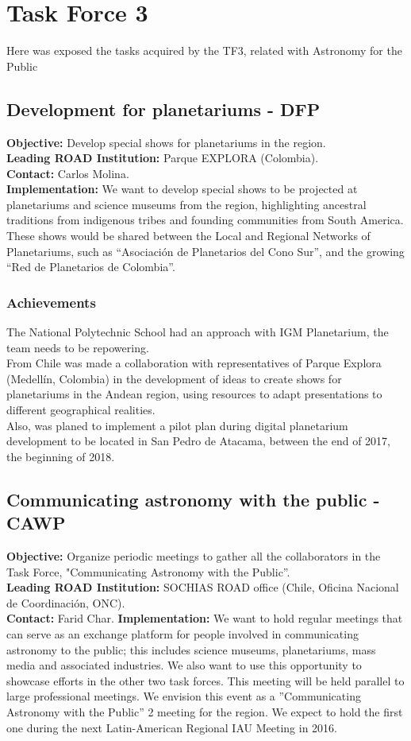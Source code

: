 \newpage
\section{Task Force 3}
\label{chapter 4}

Here was exposed the tasks acquired by the TF3, related with Astronomy for the Public

\subsection{Development for planetariums - DFP}
\textbf{Objective:} Develop special shows for planetariums in the region.
\\
\textbf{Leading ROAD Institution:} Parque EXPLORA (Colombia).
\\
\textbf{Contact:} Carlos Molina.
\\
\textbf{Implementation:} We want to develop special shows to be projected at planetariums and science museums from the region, highlighting ancestral traditions from indigenous tribes and founding communities from South America. These shows would be shared between the Local and Regional Networks of Planetariums, such as “Asociación de Planetarios
del Cono Sur”, and the growing “Red de Planetarios de Colombia”.

\subsubsection{Achievements}
The National Polytechnic School had an approach with IGM Planetarium, the team needs to be repowering.
\\
From Chile was made a collaboration with representatives of Parque Explora (Medellín, Colombia) in the development of ideas to create shows for planetariums in the Andean region, using resources to adapt presentations to different geographical realities.
\\
Also, was planed to implement a pilot plan during digital planetarium development to be located in San Pedro de Atacama, between the end of 2017, the beginning of 2018.

\subsection{Communicating astronomy with the public - CAWP}
\textbf{Objective:} Organize periodic meetings to gather all the collaborators in the Task Force, "Communicating Astronomy with the Public”.
\\
\textbf{Leading ROAD Institution:} SOCHIAS ROAD office (Chile, Oficina Nacional de Coordinación, ONC).
\\
\textbf{Contact:} Farid Char.
\textbf{Implementation:} We want to hold regular meetings that can serve as an exchange platform for people involved in communicating astronomy to the public; this includes science museums, planetariums, mass media and associated industries. We also want to use this opportunity to showcase efforts in the other two task forces. This meeting will be
held parallel to large professional meetings. We envision this event as a ”Communicating Astronomy with the Public” 2 meeting for the region. We expect to hold the first one during the next Latin-American Regional IAU Meeting in 2016.


